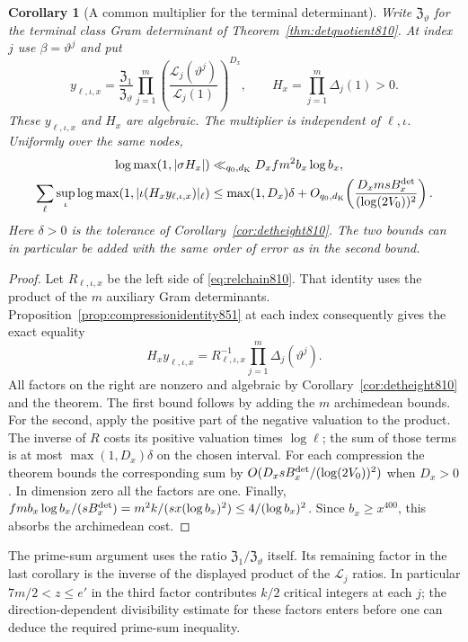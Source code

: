 \documentclass[a4paper,11pt]{article}
\newtheorem{corollary}[proposition]{Corollary}
\theoremstyle{definition}
\theoremstyle{remark}
\numberwithin{equation}{section}
\begin{document}
\begin{corollary}[A common multiplier for the terminal determinant]
\leavevmode\label{cor:terminalcomparison851}
Write \(\mathfrak Z_\vartheta\) for the terminal class Gram
determinant of Theorem~\ref{thm:detquotient810}. At index \(j\)
use \(\beta=\vartheta^j\) and put
\[
 y_{\ell,\iota,x}
  =\frac{\mathfrak Z_1}{\mathfrak Z_\vartheta}
       \prod_{j=1}^m
        \left(\frac{\mathcal L_j(\vartheta^j)}{\mathcal L_j(1)}
        \right)^{D_x},\qquad
                    H_x=\prod_{j=1}^m\Delta_j(1)>0 .
\]
These \(y_{\ell,\iota,x}\) and \(H_x\) are algebraic. The multiplier
is independent of \(\ell,\iota\). Uniformly over the same nodes,
\[
 \begin{split}
 \log\max(1,|\sigma H_x|)
      &\ll_{q_0,d_{\rm K}}D_x f m^2 b_x\log b_x,\\
 \sum_\ell \sup_{\iota}
              \log\max(1,|\iota(H_x y_{\ell,\iota,x})|_\ell)
      &\le \max(1,D_x)\delta+
         O_{q_0,d_{\rm K}}\!\left(
             \frac{D_x m s B_x^{\rm det}}{(\log(2V_0))^2}\right).
 \end{split}
\]
Here \(\delta>0\) is the tolerance of
Corollary~\ref{cor:detheight810}. The two bounds can in particular
be added with the same order of error as in the second bound.
\end{corollary}
\begin{proof}
Let \(R_{\ell,\iota,x}\) be the left side of
\eqref{eq:relchain810}. That identity uses the product of the
\(m\) auxiliary Gram determinants. Proposition~\ref{prop:compressionidentity851}
at each index consequently gives the exact equality
\[
         H_x y_{\ell,\iota,x}
              =R_{\ell,\iota,x}^{-1}\prod_{j=1}^m\Delta_j(\vartheta^j).
\]
All factors on the right are nonzero and algebraic by
Corollary~\ref{cor:detheight810} and the theorem. The first
bound follows by adding the \(m\) archimedean bounds. For the
second, apply the positive part of the negative valuation to
the product. The inverse of \(R\) costs its positive valuation
times \(\log\ell\); the sum of those terms is at most
\(\max(1,D_x)\delta\) on the chosen interval. For each
compression the theorem bounds the corresponding sum by
\(O(D_xsB_x^{\rm det}/(\log(2V_0))^2)\) when \(D_x>0\).
In dimension zero all the factors are one. Finally,
\(f m b_x\log b_x/(sB_x^{\rm det})
=m^2k/(sx(\log b_x)^2)\le4/(\log b_x)^2\).
Since \(b_x\ge x^{400}\), this absorbs the archimedean cost.
\end{proof}

The prime-sum argument uses the ratio
\(\mathfrak Z_1/\mathfrak Z_\vartheta\) itself. Its remaining
factor in the last corollary is the inverse of the displayed
product of the \(\mathcal L_j\) ratios. In particular
\(7m/2< z\le e'\) in the third factor contributes \(k/2\)
critical integers at each \(j\); the direction-dependent
divisibility estimate for these factors enters before one
can deduce the required prime-sum inequality.
\clearpage
\end{document}
